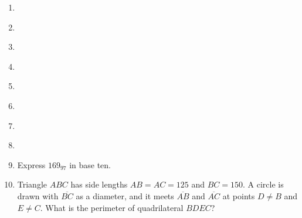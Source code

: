 \documentclass{article}
\begin{document}
\begin{enumerate}
\item \underline{\hspace{3in}}\vspace{1cm}
\item \underline{\hspace{3in}}\vspace{1cm}
\item \underline{\hspace{3in}}\vspace{1cm}
\item \underline{\hspace{3in}}\vspace{1cm}
\item \underline{\hspace{3in}}\vspace{1cm}
\item \underline{\hspace{3in}}\vspace{1cm}
\item \underline{\hspace{3in}}\vspace{1cm}
\item \underline{\hspace{3in}}\vspace{1cm}
\item Express $169_{97}$ in base ten.\vspace{1cm}
\item Triangle $ABC$ has side lengths $AB = AC = 125$ and $BC = 150$. A circle is drawn with $\overline{BC}$ as a diameter, and it meets $\overline{AB}$ and $\overline{AC}$ at points $D\neq B$ and $E\neq C$. What is the perimeter of quadrilateral $BDEC$?
\end{enumerate}
\end{document}
